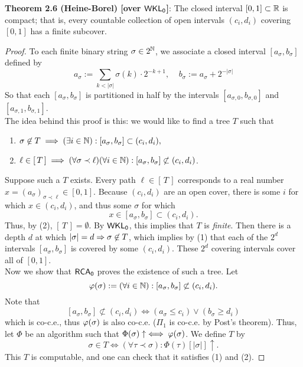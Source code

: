 \documentclass{amsart}
\begin{document}
	\noindent \textbf{Theorem 2.6 (Heine-Borel) [over $\operatorname{\sf{WKL_0}}$]}: The closed interval $[0,1]\subset \mathbb{R}$ is compact; that is, every countable collection of open intervals $(c_i,d_i)$ covering $[0,1]$ has a finite subcover.
	\begin{proof}
		To each finite binary string $\sigma \in 2^{\mathbb{N}}$, we associate a closed interval $[a_{\sigma},b_{\sigma}]$ defined by
		$$
		a_{\sigma} := \sum_{k<|\sigma|} \sigma(k) \cdot 2^{-k+1}, \;\;\;\; b_{\sigma} := a_{\sigma} + 2^{-|\sigma|}
		$$
		So that each $[a_{\sigma},b_{\sigma}]$ is partitioned in half by the intervals $[a_{\sigma,0},b_{\sigma,0}]$ and $[a_{\sigma,1},b_{\sigma,1}]$.\\
		
		The idea behind this proof is this: we would like to find a tree $T$ such that 
		\begin{enumerate}
			\item $\sigma \not\in T \implies (\exists i\in \mathbb{N}): [a_{\sigma},b_{\sigma}]\subset (c_i,d_i),$
			\item $\ell \in [\, T\, ] \implies (\forall \sigma \prec \ell)(\forall i \in \mathbb{N}): [a_{\sigma},b_{\sigma}]\not\subset (c_i,d_i)$.
		\end{enumerate}
		Suppose such a $T$ exists. Every path $\ell\in [\,T\,]$ corresponds to a real number $x=(a_{\sigma})_{\sigma\prec \ell}\in [0,1]$.  Because $(c_i,d_i)$ are an open cover, there is some $i$ for which $x\in (c_i,d_i)$, and thus some $\sigma$ for which
		$$x\in[a_{\sigma},b_{\sigma}]\subset (c_i,d_i).$$
		Thus, by (2), $[\,T\,]=\emptyset$. By $\operatorname{\sf{WKL_0}}$, this implies that $T$ is \textit{finite}. Then there is a depth $d$ at which $|\sigma|=d\Rightarrow \sigma\not\in T$, which implies by (1) that each of the $2^d$ intervals $[a_{\sigma},b_{\sigma}]$ is covered by some $(c_i,d_i)$. These $2^d$ covering intervals cover all of $[0,1]$.\\
		
		Now we show that $\operatorname{\sf{RCA_0}}$ proves the existence of such a tree. Let
		$$
		\varphi(\sigma) := (\forall i\in \mathbb{N}): [a_{\sigma},b_{\sigma}] \not\subset (c_i,d_i).
		$$
		Note that 
		$$[a_{\sigma},b_{\sigma}]\not\subset (c_i,d_i) \iff (a_{\sigma} \leq c_i) \vee (b_{\sigma} \geq d_i)$$
		which is co-c.e., thus $\varphi(\sigma)$ is also co-c.e. ($\Pi_1$ is co-c.e. by Post's theorem). Thus, let $\Phi$ be an algorithm such that $\Phi(\sigma)\uparrow \iff \varphi(\sigma)$. We define $T$ by
		$$
		\sigma \in T \iff (\forall \tau\prec \sigma): \Phi(\tau)[|\sigma|]\uparrow.
		$$
		This $T$ is computable, and one can check that it satisfies (1) and (2).
	\end{proof}\\
	
\end{document}
